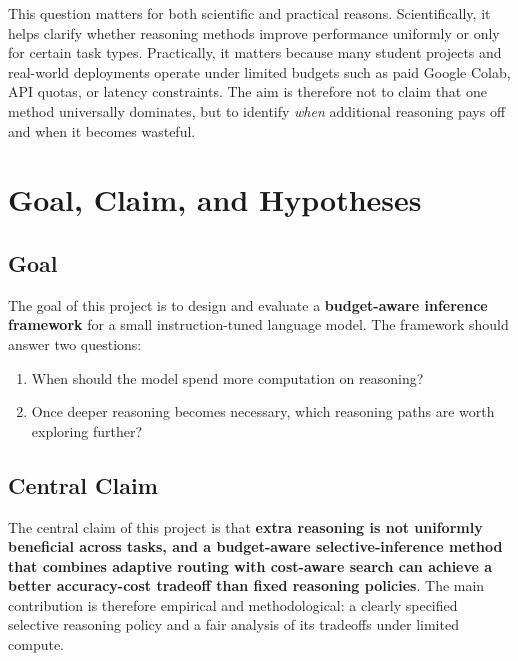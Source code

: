 \documentclass[10pt]{article}
\begin{document}
This question matters for both scientific and practical reasons. Scientifically, it helps clarify whether reasoning methods improve performance uniformly or only for certain task types. Practically, it matters because many student projects and real-world deployments operate under limited budgets such as paid Google Colab, API quotas, or latency constraints. The aim is therefore not to claim that one method universally dominates, but to identify \emph{when} additional reasoning pays off and when it becomes wasteful.

\section{Goal, Claim, and Hypotheses}
\subsection{Goal}
The goal of this project is to design and evaluate a \textbf{budget-aware inference framework} for a small instruction-tuned language model. The framework should answer two questions:
\begin{enumerate}[leftmargin=1.3em,itemsep=0.10em]
    \item When should the model spend more computation on reasoning?
    \item Once deeper reasoning becomes necessary, which reasoning paths are worth exploring further?
\end{enumerate}

\subsection{Central Claim}
The central claim of this project is that \textbf{extra reasoning is not uniformly beneficial across tasks, and a budget-aware selective-inference method that combines adaptive routing with cost-aware search can achieve a better accuracy-cost tradeoff than fixed reasoning policies}. The main contribution is therefore empirical and methodological: a clearly specified selective reasoning policy and a fair analysis of its tradeoffs under limited compute.
\end{document}
